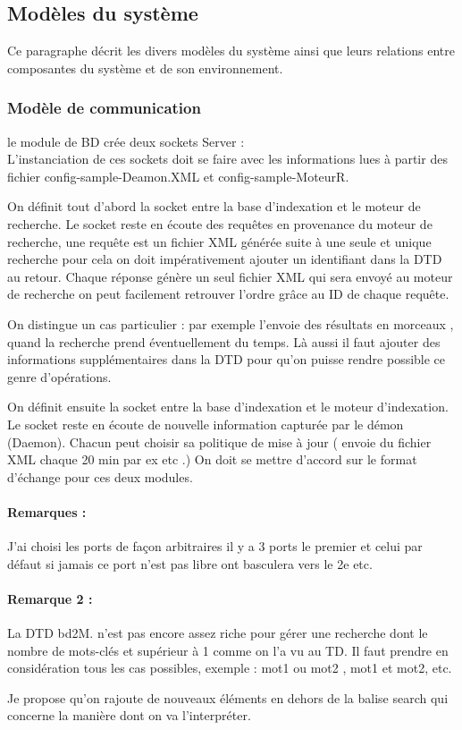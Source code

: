 \subsection{Modèles du système}
Ce paragraphe décrit les divers modèles du système ainsi que leurs relations entre composantes du système et de son environnement.

\subsubsection{Modèle de communication}
le module de BD crée deux sockets Server :\\
L’instanciation de ces sockets doit se faire avec les informations lues à partir des fichier config-sample-Deamon.XML et config-sample-MoteurR.

On définit tout d'abord la socket entre la base d'indexation et le moteur de recherche. Le socket reste en écoute 
des requêtes en provenance du moteur de recherche, une requête est un fichier XML générée suite à une seule et unique recherche pour 
cela on doit impérativement ajouter un identifiant dans la DTD au retour. Chaque réponse génère un seul fichier 
XML qui sera envoyé au moteur de recherche on peut facilement retrouver l'ordre grâce au ID de chaque requête. 

On distingue un cas particulier : par exemple l'envoie des résultats en morceaux , quand la recherche prend éventuellement du temps. 
Là aussi il faut ajouter des informations supplémentaires dans la DTD pour qu'on puisse rendre possible ce genre d'opérations.

On définit ensuite la socket entre la base d'indexation et le moteur d'indexation. Le socket reste en écoute de nouvelle information capturée par le démon
(Daemon). Chacun peut choisir sa politique de mise à jour ( envoie du fichier XML chaque 20 min par ex etc .) 
On doit se mettre d'accord sur le format d'échange pour ces deux modules. 

\paragraph{Remarques :} J'ai choisi les ports de façon arbitraires il y a 3 ports le premier et celui par défaut 
si jamais ce port n'est pas libre ont basculera vers le 2e etc. 

\paragraph{Remarque 2 :} La DTD bd2M. n'est pas encore assez riche pour gérer une recherche dont le nombre 
de mots-clés et supérieur à 1 comme on l'a vu au TD. Il faut prendre en considération tous les cas possibles, exemple :
mot1 ou mot2 , mot1 et mot2, etc. 

Je propose qu'on rajoute de nouveaux éléments en dehors de la balise search qui concerne la manière dont on va l'interpréter.